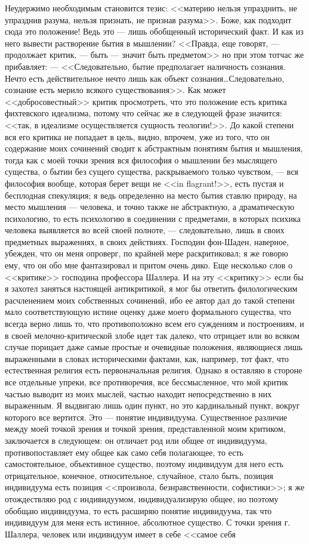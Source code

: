 \documentclass[12pt]{article}
\begin{document}
Неудержимо необходимым становится тезис: <<материю нельзя упразднить, не упразднив разума, нельзя признать, не признав разума>>. Боже, как подходит сюда это положение! Ведь это --- лишь обобщенный исторический факт. И как из него вывести растворение бытия в мышлении? <<Правда, еще говорят, --- продолжает критик, --- быть --- значит быть предметом>>  но при этом тотчас же прибавляет: --- <<Следовательно, бытие предполагает наличность сознания. Нечто есть действительное нечто лишь как объект сознания\dots Следовательно, сознание есть мерило всякого существования>>. Как может <<добросовестный>> критик просмотреть, что это положение есть критика фихтевского идеализма, потому что сейчас же в следующей фразе значится: <<так, в идеализме осуществляется сущность теологии!>>. До какой степени вся его критика не попадает в цель, видно, впрочем, уже из того, что он содержание моих сочинений сводит к абстрактным понятиям бытия и мышления, тогда как с моей точки зрения вся философия о мышлении без мыслящего существа, о бытии без сущего существа, раскрываемого только чувством, --- вся философия вообще, которая берет вещи не <<in flagrant!>>, есть пустая и бесплодная спекуляция; я ведь определенно на место бытия ставлю природу, на место мышления --- человека, и точно также не абстрактную, а драматическую психологию, то есть психологию в соединении с предметами, в которых психика человека выявляется во всей своей полноте, --- следовательно, лишь в своих предметных выражениях, в своих действиях. Господин фон-Шаден, наверное, убежден, что он меня опроверг, по крайней мере раскритиковал; я же говорю ему, что он обо мне фантазировал и притом очень дико. Еще несколько слов о <<критике>> господина профессора Шаллера. И на эту <<критику>>  если бы я захотел заняться настоящей антикритикой, я мог бы ответить филологическим расчленением моих собственных сочинений, ибо ее автор дал до такой степени мало соответствующую истине оценку даже моего формального существа, что всегда верно лишь то, что противоположно всем его суждениям и построениям, и в своей мелочно-критической злобе идет так далеко, что отрицает или во всяком случае порицает даже самые простые и очевидные положения, являющиеся лишь выраженными в словах историческими фактами, как, например, тот факт, что естественная религия есть первоначальная религия. Однако я оставляю в стороне все отдельные упреки, все противоречия, все бессмысленное, что мой критик частью выводит из моих мыслей, частью находит непосредственно в них выраженным. Я выдвигаю лишь один пункт, но это кардинальный пункт, вокруг которого все вертится. Это --- понятие индивидуума. Существенное различие между моей точкой зрения и точкой зрения, представленной моим критиком, заключается в следующем: он отличает род или общее от индивидуума, противопоставляет ему общее как само себя полагающее, то есть самостоятельное, объективное существо, поэтому индивидуум для него есть отрицательное, конечное, относительное, случайное, стало быть, позиция индивидуума есть позиция <<произвола, безнравственности, софистики>>; я же отождествляю род с индивидуумом, индивидуализирую общее, но поэтому обобщаю индивидуума, то есть расширяю понятие индивидуума, так что индивидуум для меня есть истинное, абсолютное существо. С точки зрения г. Шаллера, человек или индивидуум имеет в себе <<самое себя 
\end{document}
